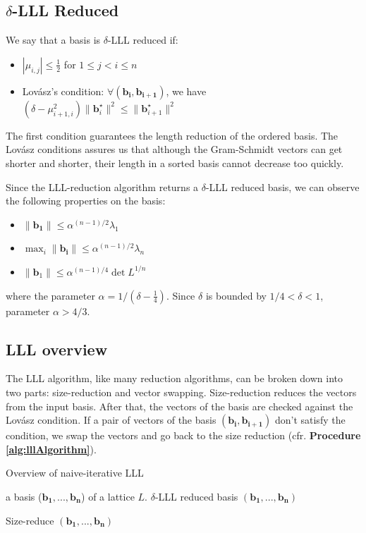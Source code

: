 \documentclass[10pt, a4paper]{article}
\renewcommand{\vec}[1]{\mathbf{#1}}
\begin{document}
\subsection{$\delta$-LLL Reduced}
We say that a basis is $\delta$-LLL reduced if:
\begin{itemize}
\item $| \mu_{i,j}| \leq \frac{1}{2} $ for $1 \leq j < i \leq n$
\item Lovász's condition: $\forall (\vec{b_i, b_{i+1}})$, we have $(\delta - \mu^2_{i+1,i}) \|\vec{b}^{\star}_{i}\|^2 \leq \| \vec{b}^{\star}_{i+1} \|^2$
\end{itemize}

The first condition guarantees the length reduction of the ordered basis.
The Lovász conditions assures us that although the Gram-Schmidt vectors can get shorter and shorter, their length in a sorted basis cannot decrease too quickly.

Since the LLL-reduction algorithm returns a $\delta$-LLL reduced basis, we can observe the following properties on the basis:
\begin{itemize}
\item $\| \vec{b_1} \| \leq \alpha^{(n-1)/2} \lambda_1 $
\item $\max_i \| \vec{b_i} \| \leq \alpha^{(n-1)/2} \lambda_n $
\item $\| \vec{b}_1 \| \leq \alpha^{(n-1)/4} \det L^{1/n}$\end{itemize} 
where the parameter $\alpha = 1/(\delta - \frac{1}{4})$. Since $\delta$ is bounded by $1/4 < \delta < 1$, parameter $\alpha > 4/3$.

\subsection{LLL overview}

The LLL algorithm, like many reduction algorithms, can be broken down into two parts: size-reduction and vector swapping. Size-reduction reduces the vectors from the input basis. After that, the vectors of the basis are checked against the Lovász condition. If a pair of vectors of the basis $(\vec{b_{i}}, \vec{b_{i+1}})$ don't satisfy the condition, we swap the vectors and go back to the size reduction (cfr. \textbf{Procedure \ref{alg:lllAlgorithm}}).

\begin{algorithm}[H]
\caption{Overview of naive-iterative LLL}
\label{alg:lllAlgorithm}
\begin{algorithmic}[1]
\REQUIRE a basis ($\vec{b_1, ..., b_n}$) of a lattice $L$.
\ENSURE $\delta$-LLL reduced basis $(\vec{b_1, ..., b_n})$

\STATE Size-reduce $(\vec{b_1, ..., b_n})$
 \STATE{swap $\vec{b_j}$ and $\vec{b_{j+1}}$, go back to step 1} \ENDIF

\end{algorithmic}
\end{algorithm}
\end{document}
